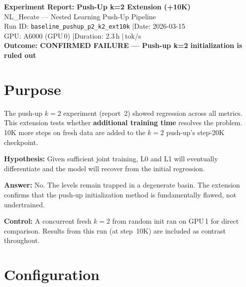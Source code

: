 \documentclass[11pt,a4paper]{article}
\begin{document}
\begin{center}
    {\LARGE\bfseries Experiment Report: Push-Up k=2 Extension (+10K)}\\[0.6em]
    {\large\color{nlgray} NL\_Hecate --- Nested Learning Push-Up Pipeline}\\[0.4em]
    {\normalsize Run ID: \texttt{baseline\_pushup\_p2\_k2\_ext10k} \quad|\quad Date: 2026-03-15}\\[0.3em]
    {\normalsize GPU: A6000 (GPU\,0) \quad|\quad Duration: 2.3\,h \quad|\,tok/s}\\[0.5em]
    {\large\color{red}\bfseries Outcome: CONFIRMED FAILURE --- Push-up k=2 initialization is ruled out}
\end{center}
\vspace{1em}

\section{Purpose}

The push-up $k{=}2$ experiment (report~2) showed regression across all metrics. This extension
tests whether \textbf{additional training time} resolves the problem. 10K more steps on fresh
data are added to the $k{=}2$ push-up's step-20K checkpoint.

\textbf{Hypothesis:} Given sufficient joint training, L0 and L1 will eventually differentiate and
the model will recover from the initial regression.

\textbf{Answer:} No. The levels remain trapped in a degenerate basin. The extension confirms
that the push-up initialization method is fundamentally flawed, not undertrained.

\textbf{Control:} A concurrent \textcolor{nlgreen}{fresh $k{=}2$ from random init} ran
on GPU\,1 for direct comparison. Results from this run (at step~10K) are included as contrast
throughout.


\section{Configuration}
\end{document}
